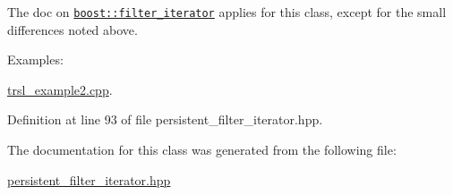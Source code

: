 The doc on \href{http://www.boost.org/libs/iterator/doc/filter_iterator.html}{\tt boost::filter\_\-iterator} applies for this class, except for the small differences noted above. \begin{Desc}
\item[Examples: ]\par


\hyperlink{trsl__example2_8cpp-example}{trsl\_\-example2.cpp}.\end{Desc}


Definition at line 93 of file persistent\_\-filter\_\-iterator.hpp.

The documentation for this class was generated from the following file:\begin{DoxyCompactItemize}
\item 
\hyperlink{persistent__filter__iterator_8hpp}{persistent\_\-filter\_\-iterator.hpp}\end{DoxyCompactItemize}

